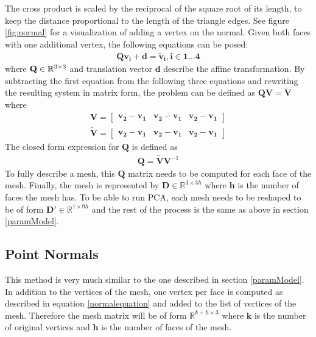 The cross product is scaled by the reciprocal of the square root of its length, to keep the distance proportional to the length of the triangle edges. See figure \ref{fig:normal} for a visualization of adding a vertex on the normal.
Given both faces with one additional vertex, the following equations can be posed:
\begin{gather}
 \mathbf{Q}\mathbf{v_i}+\mathbf{d} = \mathbf{\tilde{v}_i}, \mathbf{i} \in \mathbf{1} \dotsc \mathbf{4}
\end{gather}
where $\mathbf{Q} \in \mathbb{R}^{3 \times 3}$ and translation vector $\mathbf{d}$ describe the affine transformation. By subtracting the first equation from the following three equations and rewriting the resulting system in matrix form, the problem can be defined as $\mathbf{Q}\mathbf{V}=\mathbf{\tilde{V}}$ where
\begin{gather}
  \mathbf{V} =
  \begin{bmatrix}
   \mathbf{v_2} - \mathbf{v_1}&\mathbf{v_2} - \mathbf{v_1}&\mathbf{v_2} - \mathbf{v_1}
  \end{bmatrix} \\
  \mathbf{\tilde{V}} =
  \begin{bmatrix}
   \mathbf{\mathbf{v}_2} - \mathbf{\mathbf{v}_1}&\mathbf{\mathbf{v}_2} - \mathbf{\mathbf{v}_1}&\mathbf{\mathbf{v}_2} - \mathbf{\mathbf{v}_1}
  \end{bmatrix}
\end{gather}
The closed form expression for $\mathbf{Q}$ is defined as
\begin{gather}
  \mathbf{Q}=\mathbf{\tilde{V}}\mathbf{V}^{-1}
\end{gather}
To fully describe a mesh, this $\mathbf{Q}$ matrix needs to be computed for each face of the mesh. Finally, the mesh is represented by $\mathbf{D} \in \mathbb{R}^{3 \times 3h}$ where $\mathbf{h}$ is the number of faces the mesh has. To be able to run PCA, each mesh needs to be reshaped to be of form $\mathbf{D'} \in \mathbb{R}^{1 \times 9h}$ and the rest of the process is the same as above in section \ref{paramModel}.

\subsection{Point Normals}
This method is very much similar to the one described in section \ref{paramModel}. In addition to the vertices of the mesh, one vertex per face is computed as described in equation \ref{normalequation} and added to the list of vertices of the mesh. Therefore the mesh matrix will be of form $\mathbb{R}^{k+h \times 3}$ where $\mathbf{k}$ is the number of original vertices and $\mathbf{h}$ is the number of faces of the mesh.

